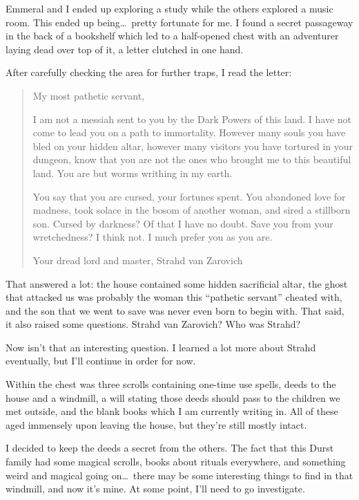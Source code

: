 Emmeral and I ended up exploring a study while the others explored a music room. This ended up being\dots\ pretty fortunate for me. I found a secret passageway in the back of a bookshelf which led to a half-opened chest with an adventurer laying dead over top of it, a letter clutched in one hand.

After carefully checking the area for further traps, I read the letter:

\begin{quote}
My most pathetic servant,

I am not a messiah sent to you by the Dark Powers of this land. I have not come to lead you on a path to immortality. However many souls you have bled on your hidden altar, however many visitors you have tortured in your dungeon, know that you are not the ones who brought me to this beautiful land. You are but worms writhing in my earth.

You say that you are cursed, your fortunes spent. You abandoned love for madness, took solace in the bosom of another woman, and sired a stillborn son. Cursed by darkness? Of that I have no doubt. Save you from your wretchedness? I think not. I much prefer you as you are.

Your dread lord and master,
Strahd van Zarovich
\end{quote}

That answered a lot: the house contained some hidden sacrificial altar, the ghost that attacked us was probably the woman this ``pathetic servant'' cheated with, and the son that we went to save was never even born to begin with. That said, it also raised some questions. Strahd van Zarovich? Who was Strahd?

Now isn't that an interesting question. I learned a lot more about Strahd eventually, but I'll continue in order for now.

Within the chest was three scrolls containing one-time use spells, deeds to the house and a windmill, a will stating those deeds should pass to the children we met outside, and the blank books which I am currently writing in. All of these aged immensely upon leaving the house, but they're still mostly intact.

I decided to keep the deeds a secret from the others. The fact that this Durst family had some magical scrolls, books about rituals everywhere, and something weird and magical going on\dots\ there may be some interesting things to find in that windmill, and now it's mine. At some point, I'll need to go investigate.

